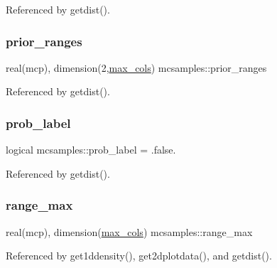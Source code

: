 Referenced by getdist().

\mbox{\label{namespacemcsamples_a0902678bdbc7aa6ef8b8992ce0a19c5e}} 
\subsubsection{\texorpdfstring{prior\+\_\+ranges}{prior\_ranges}}
{\footnotesize\ttfamily real(mcp), dimension(2,\mbox{\hyperlink{namespacemcsamples_ae8386bad918d8af8d203683c01d5818c}{max\+\_\+cols}}) mcsamples\+::prior\+\_\+ranges}



Referenced by getdist().

\mbox{\label{namespacemcsamples_ad626a7a57271fbc966f7d06ed74f68af}} 
\subsubsection{\texorpdfstring{prob\+\_\+label}{prob\_label}}
{\footnotesize\ttfamily logical mcsamples\+::prob\+\_\+label = .false.}



Referenced by getdist().

\mbox{\label{namespacemcsamples_adb075c5195b30137b257a06000257c4a}} 
\subsubsection{\texorpdfstring{range\+\_\+max}{range\_max}}
{\footnotesize\ttfamily real(mcp), dimension(\mbox{\hyperlink{namespacemcsamples_ae8386bad918d8af8d203683c01d5818c}{max\+\_\+cols}}) mcsamples\+::range\+\_\+max}



Referenced by get1ddensity(), get2dplotdata(), and getdist().

\mbox{\label{namespacemcsamples_a1ad9378542a0d4ed8222e002f28b8a4f}} 
